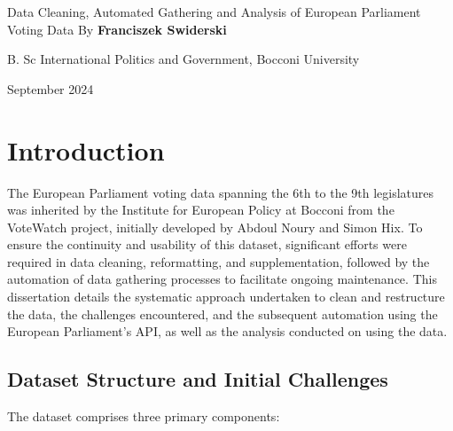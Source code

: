 \documentclass{report}
\begin{document}
  
\begin{titlepage}   
\centering    
{\Large Data Cleaning, Automated Gathering and Analysis of European Parliament Voting Data}    
{By \textbf{Franciszek Swiderski}}    

{B. Sc International Politics and Government, Bocconi University}    

{September 2024}    

\vspace{1cm} %
\end{titlepage}  
\section{Introduction} 
The European Parliament voting data spanning the 6th to the 9th legislatures was inherited by the Institute for European Policy at Bocconi from the VoteWatch project, initially developed by Abdoul Noury and Simon Hix. To ensure the continuity and usability of this dataset, significant efforts were required in data cleaning, reformatting, and supplementation, followed by the automation of data gathering processes to facilitate ongoing maintenance. This dissertation details the systematic approach undertaken to clean and restructure the data, the challenges encountered, and the subsequent automation using the European Parliament's API, as well as the analysis conducted on using the data. 
\subsection{Dataset Structure and Initial Challenges}
The dataset comprises three primary components:  
\end{document}
